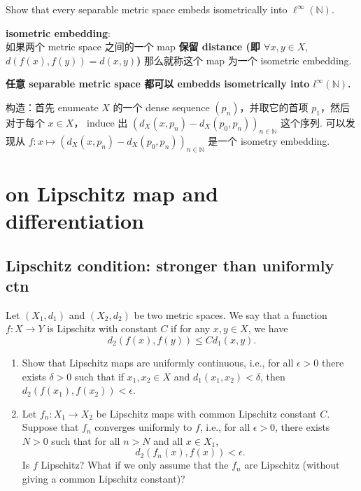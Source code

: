 \documentclass[lang=cn,11pt]{template}
\begin{document}
Show that every separable metric space embeds isometrically into \( \ell^\infty(\mathbb{N}) \).

\begin{definition}
    \textbf{isometric embedding}: \\
    如果两个 metric space 之间的一个 map\textbf{ 保留 distance (即 $\forall x,y \in X, $ $d(f(x), f(y)) = d(x,y)$)} 那么就称这个 map 为一个 isometric embedding.
\end{definition}

\begin{theorem}
    \textbf{任意 separable metric space 都可以 embedds isometrically into $l^{\infty}(\mathbb{N})$.}
\end{theorem}

\proof 构造：首先 enumeate  $X$ 的一个 dense sequence $(p_n)$，并取它的首项 $p_1$，然后对于每个 $x \in X$， induce 出 $(d_X(x, p_n) - d_X(p_0, p_n))_{n \in \mathbb{N}}$ 这个序列. 可以发现从 $f: x \mapsto (d_X(x, p_n) - d_X(p_0, p_n))_{n \in \mathbb{N}}$ 是一个 isometry embedding. 






\chapter{on Lipschitz map and differentiation}
\section{Lipschitz condition: stronger than uniformly ctn}
Let \( (X_1, d_1) \) and \( (X_2, d_2) \) be two metric spaces. We say that a function \( f : X \to Y \) is Lipschitz with constant \( C \) if for any \( x, y \in X \), we have
\[
d_2(f(x), f(y)) \leq C d_1(x, y).
\]
\begin{enumerate}
    \item Show that Lipschitz maps are uniformly continuous, i.e., for all \( \epsilon > 0 \) there exists \( \delta > 0 \) such that if \( x_1, x_2 \in X \) and \( d_1(x_1, x_2) < \delta \), then \( d_2(f(x_1), f(x_2)) < \epsilon \).
    \item Let \( f_n : X_1 \to X_2 \) be Lipschitz maps with common Lipschitz constant \( C \). Suppose that \( f_n \) converges uniformly to \( f \), i.e., for all \( \epsilon > 0 \), there exists \( N > 0 \) such that for all \( n > N \) and all \( x \in X_1 \),
    \[
    d_2(f_n(x), f(x)) < \epsilon.
    \]
    Is \( f \) Lipschitz? What if we only assume that the \( f_n \) are Lipschitz (without giving a common Lipschitz constant)?
\end{enumerate}
\end{document}
